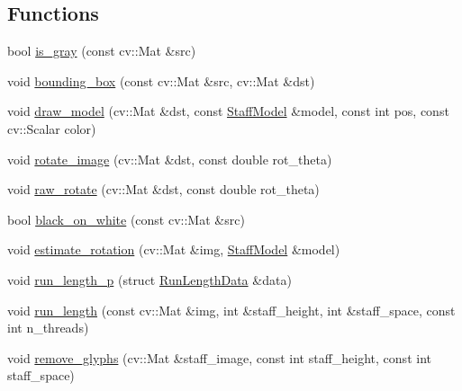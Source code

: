 \subsection*{Functions}
\begin{DoxyCompactItemize}
\item 
bool \hyperlink{namespaceanonymous__namespace_02staff_8cc_03_a79495cf4f6a32aa51f293ed70e818804}{is\+\_\+gray} (const cv\+::\+Mat \&src)
\item 
void \hyperlink{namespaceanonymous__namespace_02staff_8cc_03_a57d06804211d80274cc40825db82bfcb}{bounding\+\_\+box} (const cv\+::\+Mat \&src, cv\+::\+Mat \&dst)
\item 
void \hyperlink{namespaceanonymous__namespace_02staff_8cc_03_a3568b86a70e0f8a3daec31a019eeb104}{draw\+\_\+model} (cv\+::\+Mat \&dst, const \hyperlink{structStaffModel}{Staff\+Model} \&model, const int pos, const cv\+::\+Scalar color)
\item 
void \hyperlink{namespaceanonymous__namespace_02staff_8cc_03_a9156ea35902498bfb94f9f22b8f4bf6e}{rotate\+\_\+image} (cv\+::\+Mat \&dst, const double rot\+\_\+theta)
\item 
void \hyperlink{namespaceanonymous__namespace_02staff_8cc_03_a5bdda2981a95b5eb6d486efc14676724}{raw\+\_\+rotate} (cv\+::\+Mat \&dst, const double rot\+\_\+theta)
\item 
bool \hyperlink{namespaceanonymous__namespace_02staff_8cc_03_a63818cc0df79b80ab6ffcad5b63df63a}{black\+\_\+on\+\_\+white} (const cv\+::\+Mat \&src)
\item 
void \hyperlink{namespaceanonymous__namespace_02staff_8cc_03_a6e1c8cba88d76c900e8c838e6e97beb8}{estimate\+\_\+rotation} (cv\+::\+Mat \&img, \hyperlink{structStaffModel}{Staff\+Model} \&model)
\item 
void \hyperlink{namespaceanonymous__namespace_02staff_8cc_03_ab0f140df81f62c7aa0f330a0a876b5cf}{run\+\_\+length\+\_\+p} (struct \hyperlink{structanonymous__namespace_02staff_8cc_03_1_1RunLengthData}{Run\+Length\+Data} \&data)
\item 
void \hyperlink{namespaceanonymous__namespace_02staff_8cc_03_afe2c1f1f40fd4b176293cdc981bdd6b9}{run\+\_\+length} (const cv\+::\+Mat \&img, int \&staff\+\_\+height, int \&staff\+\_\+space, const int n\+\_\+threads)
\item 
void \hyperlink{namespaceanonymous__namespace_02staff_8cc_03_a88b9ddc21068ab319b4e4366abb95a8b}{remove\+\_\+glyphs} (cv\+::\+Mat \&staff\+\_\+image, const int staff\+\_\+height, const int staff\+\_\+space)
\item 

\end{DoxyCompactItemize}
